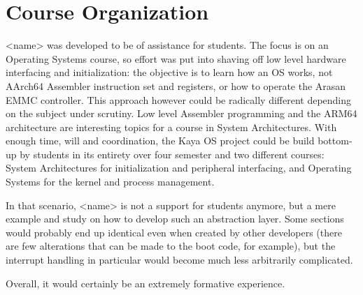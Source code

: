 \documentclass[12pt,a4paper,openright,twoside]{report}
\begin{document}
\section{Course Organization}
<name> was developed to be of assistance for students. The focus is on an Operating
Systems course, so effort was put into shaving off low level hardware interfacing
and initialization: the objective is to learn how an OS works, not AArch64 Assembler
instruction set and registers, or how to operate the Arasan EMMC controller.
This approach however could be radically different depending on the subject under 
scrutiny. Low level Assembler programming and the ARM64 architecture are interesting
topics for a course in System Architectures. With enough time, will and coordination,
the Kaya OS project could be build bottom-up by students in its entirety over four
semester and two different courses: System Architectures for initialization and
peripheral interfacing, and Operating Systems for the kernel and process management.

In that scenario, <name> is not a support for students anymore, but a mere example
and study on how to develop such an abstraction layer. Some sections would probably
end up identical even when created by other developers (there are few alterations
that can be made to the boot code, for example), but the interrupt handling in 
particular would become much less arbitrarily complicated. 

Overall, it would certainly be an extremely formative experience.
\end{document}

